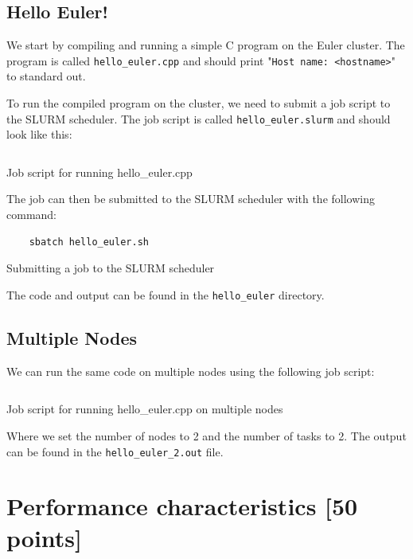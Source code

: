 \documentclass[unicode,11pt,a4paper,oneside,numbers=endperiod,openany]{scrartcl}
\begin{document}
\subsection{Hello Euler!}

We start by compiling and running a simple C program on the Euler cluster. The program is called \texttt{hello\_euler.cpp} and should print "\texttt{Host name: <hostname>}" to standard out.

To run the compiled program on the cluster, we need to submit a job script to the SLURM scheduler. The job script is called \texttt{hello\_euler.slurm} and should look like this:

\begin{listing}[!ht]
    \inputminted{bash}{../01a/hello_euler/hello_euler_1.sh}
    \caption{Job script for running hello\_euler.cpp}
    \label{lst:hello_euler}
\end{listing}

The job can then be submitted to the SLURM scheduler with the following command:

\begin{listing}[!ht]
    \begin{verbatim}
    sbatch hello_euler.sh
    \end{verbatim}
    \caption{Submitting a job to the SLURM scheduler}
    \label{lst:sbatch}
\end{listing}

The code and output can be found in the \texttt{hello\_euler} directory.

\subsection{Multiple Nodes}

We can run the same code on multiple nodes using the following job script:


\begin{listing}[!ht]
    \inputminted{bash}{../01a/hello_euler/hello_euler_2.sh}
    \caption{Job script for running hello\_euler.cpp on multiple nodes}
    \label{lst:hello_euler_2}
\end{listing}

Where we set the number of nodes to 2 and the number of tasks to 2. The output can be found in the \texttt{hello\_euler\_2.out} file.

\section{Performance characteristics [50 points]}
\end{document}
